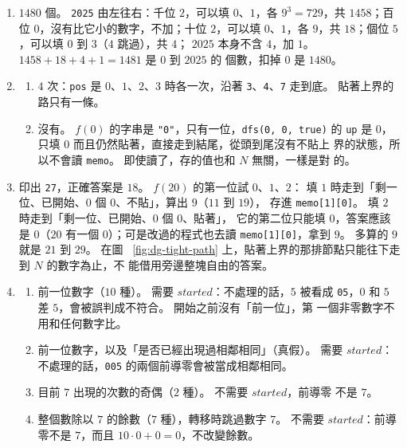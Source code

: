 \begin{enumerate}
\item $1480$ 個。 \texttt{2025} 由左往右：千位 $2$，可以填 $0$、$1$，各
$9^3 = 729$，共 $1458$；百位 $0$，沒有比它小的數字，不加；十位 $2$，可以填
$0$、$1$，各 $9$，共 $18$；個位 $5$，可以填 $0$ 到 $3$（$4$ 跳過），共 $4$；
$2025$ 本身不含 $4$，加 $1$。 $1458 + 18 + 4 + 1 = 1481$ 是 $0$ 到 $2025$ 的
個數，扣掉 $0$ 是 $1480$。

\item
\begin{enumerate}
\item $4$ 次：\texttt{pos} 是 $0$、$1$、$2$、$3$ 時各一次，沿著
\texttt{3}、\texttt{4}、\texttt{7} 走到底。 貼著上界的路只有一條。
\item 沒有。 $f(0)$ 的字串是 \texttt{"0"}，只有一位，\texttt{dfs(0, 0, true)}
的 \texttt{up} 是 $0$，只填 $0$ 而且仍然貼著，直接走到結尾，從頭到尾沒有不貼上
界的狀態，所以不會讀 \texttt{memo}。 即使讀了，存的值也和 $N$ 無關，一樣是對
的。
\end{enumerate}

\item 印出 \texttt{27}，正確答案是 $18$。 $f(20)$ 的第一位試 $0$、$1$、$2$：
填 $1$ 時走到「剩一位、已開始、$0$ 個 $0$、不貼」，算出 $9$（$11$ 到 $19$），
存進 \texttt{memo[1][0]}。 填 $2$ 時走到「剩一位、已開始、$0$ 個 $0$、貼著」，
它的第二位只能填 $0$，答案應該是 $0$（$20$ 有一個 $0$）；可是改過的程式也去讀
\texttt{memo[1][0]}，拿到 $9$。 多算的 $9$ 就是 $21$ 到 $29$。 在圖
~\ref{fig:dg-tight-path} 上，貼著上界的那排節點只能往下走到 $N$ 的數字為止，不
能借用旁邊整塊自由的答案。

\item
\begin{enumerate}
\item 前一位數字（$10$ 種）。 需要 $\mathit{started}$：不處理的話，$5$ 被看成
\texttt{05}，$0$ 和 $5$ 差 $5$，會被誤判成不符合。 開始之前沒有「前一位」，第
一個非零數字不用和任何數字比。
\item 前一位數字，以及「是否已經出現過相鄰相同」（真假）。 需要
$\mathit{started}$：不處理的話，\texttt{005} 的兩個前導零會被當成相鄰相同。
\item 目前 $7$ 出現的次數的奇偶（$2$ 種）。 不需要 $\mathit{started}$，前導零
不是 $7$。
\item 整個數除以 $7$ 的餘數（$7$ 種），轉移時跳過數字 $7$。 不需要
$\mathit{started}$：前導零不是 $7$，而且 $10 \cdot 0 + 0 = 0$，不改變餘數。
\end{enumerate}


\end{enumerate}
